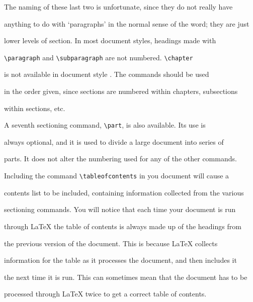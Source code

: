 The naming of these last two is unfortunate, since they do not really have

anything to do with `paragraphs' in the normal sense of the word; they are just

lower levels of section.  In most document styles, headings made with

\verb|\paragraph| and \verb|\subparagraph| are not numbered.  \verb|\chapter|

is not available in document style .  The commands should be used

in the order given, since sections are numbered within chapters, subsections

within sections, etc.



A seventh sectioning command, \verb|\part|, is also available.  Its use is

always optional, and it is used to divide a large document into series of

parts.  It does not alter the numbering used for any of the other commands.



Including the command \verb|\tableofcontents| in you document will cause a

contents list to be included, containing information collected from the various

sectioning commands.  You will notice that each time your document is run

through \LaTeX{} the table of contents is always made up of the headings from

the previous version of the document.  This is because \LaTeX{} collects

information for the table as it processes the document, and then includes it

the next time it is run.  This can sometimes mean that the document has to be

processed through \LaTeX{} twice to get a correct table of contents.



